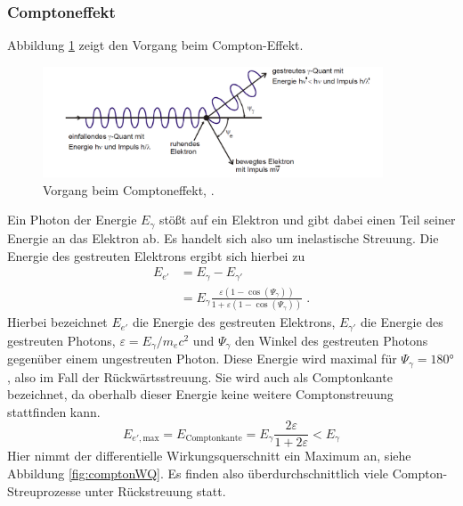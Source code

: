 \subsubsection{Comptoneffekt}
\label{sec:compton}
Abbildung \ref{fig:compton} zeigt den Vorgang beim Compton-Effekt.
\begin{figure}
  \centering
  \includegraphics[width=0.9\textwidth]{ressources/compton.png}
  \caption{Vorgang beim Comptoneffekt, \cite{skript}.}
  \label{fig:compton}
\end{figure}
Ein Photon der Energie $E_\gamma$ stößt auf ein Elektron und gibt dabei einen Teil seiner Energie an das Elektron ab. Es handelt sich also um inelastische Streuung. Die Energie des gestreuten Elektrons ergibt sich hierbei zu
\begin{align}
  E_{e'} &= E_\gamma - E_{\gamma'} \\
  &= E_\gamma \frac{\varepsilon(1-\cos(\Psi_\gamma))}{1 + \varepsilon(1-\cos(\Psi_\gamma))} \; .
  \label{eq:comptonEnergie}
\end{align}
Hierbei bezeichnet $E_{e'}$ die Energie des gestreuten Elektrons, $E_{\gamma'}$ die Energie des gestreuten Photons, $\varepsilon=E_\gamma/m_e c^2$ und $\Psi_\gamma$ den Winkel des gestreuten Photons gegenüber einem ungestreuten Photon. Diese Energie wird maximal für $\Psi_\gamma = 180°$, also im Fall der Rückwärtsstreuung. Sie wird auch als Comptonkante bezeichnet, da oberhalb dieser Energie keine weitere Comptonstreuung stattfinden kann.
\begin{equation}
  E_{e',\text{max}} = E_\text{Comptonkante} = E_\gamma \frac{2\varepsilon}{1+2\varepsilon} < E_\gamma
  \label{eq:comptonEmax}
\end{equation}
 Hier nimmt der differentielle Wirkungsquerschnitt  ein Maximum an, siehe Abbildung \ref{fig:comptonWQ}. Es finden also überdurchschnittlich viele Compton-Streuprozesse unter Rückstreuung statt.
